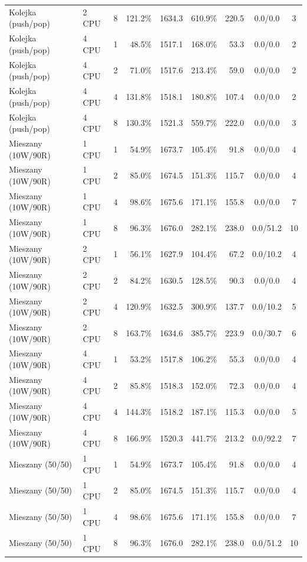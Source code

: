 \begin{table}[ht]
{\begin{tabular}{llcrrrrcc}
Kolejka (push/pop) & 2 CPU & 8 & 121.2\% & 1634.3 & 610.9\% & 220.5 & 0.0/0.0 & 3 \\
Kolejka (push/pop) & 4 CPU & 1 & 48.5\% & 1517.1 & 168.0\% & 53.3 & 0.0/0.0 & 2 \\
Kolejka (push/pop) & 4 CPU & 2 & 71.0\% & 1517.6 & 213.4\% & 59.0 & 0.0/0.0 & 2 \\
Kolejka (push/pop) & 4 CPU & 4 & 131.8\% & 1518.1 & 180.8\% & 107.4 & 0.0/0.0 & 2 \\
Kolejka (push/pop) & 4 CPU & 8 & 130.3\% & 1521.3 & 559.7\% & 222.0 & 0.0/0.0 & 3 \\
Mieszany (10W/90R) & 1 CPU & 1 & 54.9\% & 1673.7 & 105.4\% & 91.8 & 0.0/0.0 & 4 \\
Mieszany (10W/90R) & 1 CPU & 2 & 85.0\% & 1674.5 & 151.3\% & 115.7 & 0.0/0.0 & 4 \\
Mieszany (10W/90R) & 1 CPU & 4 & 98.6\% & 1675.6 & 171.1\% & 155.8 & 0.0/0.0 & 7 \\
Mieszany (10W/90R) & 1 CPU & 8 & 96.3\% & 1676.0 & 282.1\% & 238.0 & 0.0/51.2 & 10 \\
Mieszany (10W/90R) & 2 CPU & 1 & 56.1\% & 1627.9 & 104.4\% & 67.2 & 0.0/10.2 & 4 \\
Mieszany (10W/90R) & 2 CPU & 2 & 84.2\% & 1630.5 & 128.5\% & 90.3 & 0.0/0.0 & 4 \\
Mieszany (10W/90R) & 2 CPU & 4 & 120.9\% & 1632.5 & 300.9\% & 137.7 & 0.0/10.2 & 5 \\
Mieszany (10W/90R) & 2 CPU & 8 & 163.7\% & 1634.6 & 385.7\% & 223.9 & 0.0/30.7 & 6 \\
Mieszany (10W/90R) & 4 CPU & 1 & 53.2\% & 1517.8 & 106.2\% & 55.3 & 0.0/0.0 & 4 \\
Mieszany (10W/90R) & 4 CPU & 2 & 85.8\% & 1518.3 & 152.0\% & 72.3 & 0.0/0.0 & 4 \\
Mieszany (10W/90R) & 4 CPU & 4 & 144.3\% & 1518.2 & 187.1\% & 115.3 & 0.0/0.0 & 5 \\
Mieszany (10W/90R) & 4 CPU & 8 & 166.9\% & 1520.3 & 441.7\% & 213.2 & 0.0/92.2 & 7 \\
Mieszany (50/50) & 1 CPU & 1 & 54.9\% & 1673.7 & 105.4\% & 91.8 & 0.0/0.0 & 4 \\
Mieszany (50/50) & 1 CPU & 2 & 85.0\% & 1674.5 & 151.3\% & 115.7 & 0.0/0.0 & 4 \\
Mieszany (50/50) & 1 CPU & 4 & 98.6\% & 1675.6 & 171.1\% & 155.8 & 0.0/0.0 & 7 \\
Mieszany (50/50) & 1 CPU & 8 & 96.3\% & 1676.0 & 282.1\% & 238.0 & 0.0/51.2 & 10 \\

\end{tabular}}
\end{table}
